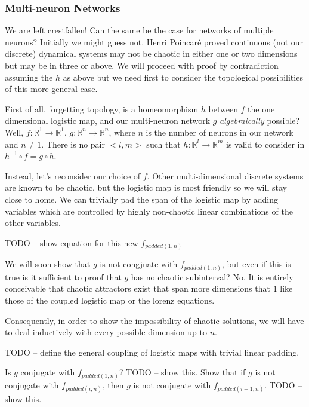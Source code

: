 \documentclass[12pt]{article}
\begin{document}
\subsubsection{Multi-neuron Networks}

We are left crestfallen!  Can the same be the case for networks of multiple
neurons?  Initially we might guess not.  Henri Poincar\'e proved continuous
(not our discrete) dynamical systems may not be chaotic in either one or two
dimensions but may be in three or above.  We will proceed with proof by 
contradiction assuming the $h$ as above but we need first to consider the
topological possibilities of this more general case.

First of all, forgetting topology, is a homeomorphism $h$ between $f$ the one 
dimensional logistic map, and our multi-neuron network $g$ 
\textit{algebraically} possible?  Well, 
$f : \mathbb{R}^{1} \rightarrow \mathbb{R}^{1}$, 
$g : \mathbb{R}^{n} \rightarrow \mathbb{R}^{n}$, where $n$ is the number of
neurons in our network and $n \neq 1$.  There is no pair $<l, m>$ such 
that $h : \mathbb{R}^{l} \rightarrow \mathbb{R}^{m}$ is valid to 
consider in $h^{-1} \circ f = g \circ h$.

Instead, let's reconsider our choice of $f$.  Other multi-dimensional discrete
systems are known to be chaotic, but the logistic map is most friendly so we
will stay close to home.  We can trivially pad  the span of the logistic
map by adding variables which are controlled by highly non-chaotic linear
combinations of the other variables.  

TODO -- show equation for this new $f_{padded(1,n)}$

We will soon show that $g$ is not congjuate with $f_{padded(1,n)}$, but even
if this is true is it sufficient to proof that $g$ has no chaotic subinterval?
No.  It is entirely conceivable that chaotic attractors exist that span
more dimensions that $1$ like those of the coupled logistic map or
the lorenz equations.

Consequently, in order to show the impossibility of chaotic solutions, we will
have to deal inductively with every possible dimension up to $n$.

TODO -- define the general coupling of logistic maps with trivial 
linear padding.

Is $g$ conjugate with $f_{padded(1,n)}$?
TODO -- show this.
Show that if $g$ is not conjugate with $f_{padded(i,n)}$, then $g$ is not conjugate with $f_{padded(i+1,n)}$.
TODO -- show this.
\end{document}
